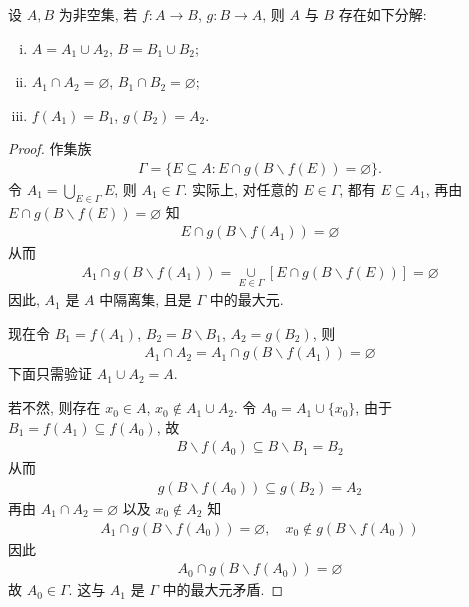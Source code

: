 \documentclass[../../main.tex]{subfiles}%
\begin{document}
\begin{lemma}[映射分解定理]\label{lemma:映射定义域与陪域的无交分解}
设 $A, B$ 为非空集, 若 $f : A \to B$, $g : B \to A$, 则 $A$ 与 $B$ 存在如下分解:
\begin{enumerate}[(i)]
\item $A = A_1 \cup A_2$, $B = B_1 \cup B_2$;
\item $A_1 \cap A_2 = \varnothing$, $B_1 \cap B_2 = \varnothing$;
\item $f(A_1) = B_1$, $g(B_2) = A_2$.
\end{enumerate}
\end{lemma}
\begin{proof}
作集族
\begin{align*}
\Gamma = \{E \subseteq A : E \cap g(B\backslash  f(E)) = \varnothing\}.
\end{align*}
令 $A_1 = \underset{E \in \Gamma}{\bigcup} E$, 则 $A_1 \in \Gamma$. 实际上, 对任意的 $E \in \Gamma$, 都有 $E \subseteq A_1$, 再由 $E \cap g(B\backslash  f(E)) = \varnothing$ 知
\begin{align*}
E \cap g(B\backslash  f(A_1)) = \varnothing
\end{align*}
从而
\begin{align*}
A_1 \cap g(B\backslash  f(A_1)) = \underset{E \in \Gamma}{\cup}[E \cap g(B\backslash  f(E))] = \varnothing
\end{align*}
因此, $A_1$ 是 $A$ 中隔离集, 且是 $\Gamma$ 中的最大元.

现在令 $B_1 = f(A_1)$, $B_2 = B\backslash  B_1$, $A_2 = g(B_2)$, 则
\begin{align*}
A_1 \cap A_2 = A_1 \cap g(B\backslash  f(A_1)) = \varnothing
\end{align*}
下面只需验证 $A_1 \cup A_2 = A$.

若不然, 则存在 $x_0 \in A$, $x_0 \notin A_1 \cup A_2$. 令 $A_0 = A_1 \cup \{x_0\}$, 由于 $B_1 = f(A_1) \subseteq f(A_0)$, 故
\begin{align*}
B\backslash  f(A_0) \subseteq B\backslash  B_1 = B_2
\end{align*}
从而
\begin{align*}
g(B\backslash  f(A_0)) \subseteq g(B_2) = A_2
\end{align*}
再由 $A_1 \cap A_2 = \varnothing$ 以及 $x_0 \notin A_2$ 知
\begin{align*}
A_1 \cap g(B\backslash  f(A_0)) = \varnothing, \quad x_0 \notin g(B\backslash  f(A_0))
\end{align*}
因此
\begin{align*}
A_0 \cap g(B\backslash  f(A_0)) = \varnothing
\end{align*}
故 $A_0 \in \Gamma$. 这与 $A_1$ 是 $\Gamma$ 中的最大元矛盾. 
\end{proof}
\end{document}
